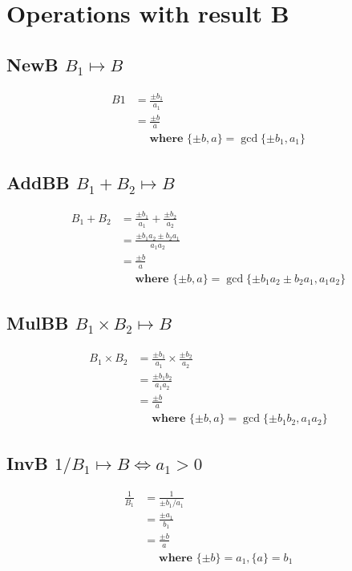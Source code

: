 \documentclass{article}
\begin{document}
\section{Operations with result B}

\subsection{NewB $B_1 \mapsto B$}
\begin{align}
B1 &= \frac{\pm b_1}{a_1}\\
 &= \frac{\pm b}{a} \\
 &\quad \textbf{ where } \{ \pm b, a \} = \gcd\{ \pm b_1, a_1 \} \nonumber
\end{align}

\subsection{AddBB $B_1 + B_2 \mapsto B$}
\begin{align}
B_1 + B_2 &= \frac{\pm b_1}{a_1} + \frac{\pm b_2}{a_2} \\
 &= \frac{\pm b_1a_2 \pm b_2a_1 }{a_1a_2} \\
 &= \frac{\pm b}{a} \\
 &\quad \textbf{ where } \{ \pm b, a \} = \gcd \{ \pm b_1a_2 \pm b_2a_1, a_1a_2 \} \nonumber
\end{align}

\subsection{MulBB $B_1 \times B_2 \mapsto B$}
\begin{align}
B_1 \times B_2 &= \frac{\pm b_1}{a_1} \times \frac{\pm b_2}{a_2} \\
  &= \frac{\pm b_1b_2}{a_1a_2} \\
  &= \frac{\pm b}{a} \\
  &\quad \textbf{ where } \{ \pm b,a \} = \gcd \{ \pm b_1b_2, a_1a_2 \} \nonumber
\end{align}

\subsection{InvB $1 / B_1 \mapsto B \iff a_1 > 0$}
\begin{align}
\frac{1}{B_1} &= \frac{1}{\pm b_1 / a_1}\\
 &= \frac{\pm a_1}{b_1} \\
 &= \frac{\pm b}{a} \\
 &\quad \textbf{ where } \{ \pm b \} = a_1, \{ a \} = b_1 \nonumber
\end{align}
\end{document}
